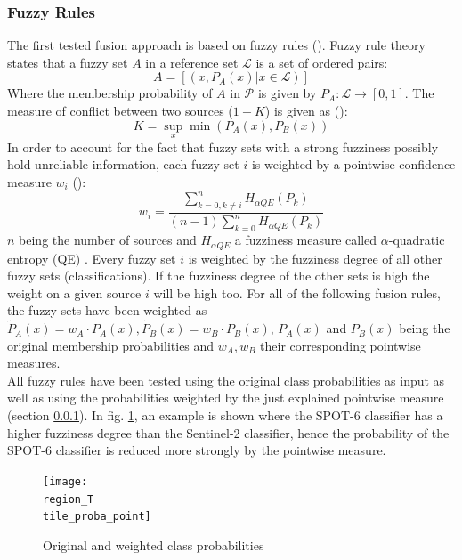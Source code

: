 \documentclass[10pt]{article}
\newcommand{\tile}{41000_30000}
\newcommand{\region}{finistere}
\begin{document}
\subsubsection{Fuzzy Rules}\label{sec:fuzzyLogic}
The first tested fusion approach is based on fuzzy rules (\cite{zadeh_fuzzy_1965}). Fuzzy rule theory states that a fuzzy set $A$ in a reference set $\mathcal{L}$ is a set of ordered pairs:
\begin{equation}
    A=[(x,P_A(x)|x\in \mathcal{L})]
\end{equation}
Where the membership probability of $A$ in $\mathcal{P}$ is given by $P_A:\mathcal{L}\rightarrow[0,1]$. The measure of conflict between two sources ($1-K$) is given as (\cite{dubois_possibility}):
\begin{equation}
    K=\sup_x\min(P_A(x), P_B(x))
\end{equation}
In order to account for the fact that fuzzy sets with a strong fuzziness possibly hold unreliable information, each fuzzy set $i$ is weighted by a pointwise confidence measure $w_i$ (\cite{fauvel_decision_fusion}):
\begin{equation}
    w_i=\frac{\sum_{k=0,k\neq i}^{n}H_{\alpha QE}(P_k)}{(n-1)\sum_{k=0}^{n}H_{\alpha QE}(P_k)}
\end{equation}
$n$ being the number of sources and $H_{\alpha QE}$ a fuzziness measure called $\alpha$-quadratic entropy (QE) \parencite{pal_measuring_1994}. Every fuzzy set $i$ is weighted by the fuzziness degree of all other fuzzy sets (classifications). If the fuzziness degree of the other sets is high the weight on a given source $i$ will be high too. For all of the following fusion rules, the fuzzy sets have been weighted as $\tilde{P}_A(x)=w_A\cdot P_A(x), \tilde{P}_B(x)=w_B\cdot P_B(x)$, $P_A(x)$ and $P_B(x)$ being the original membership probabilities and $w_A, w_B$ their corresponding pointwise measures.\\

All fuzzy rules have been tested using the original class probabilities as input  as well as using the probabilities weighted by the just explained pointwise measure (section \ref{sec:fuzzyLogic}). In fig. \ref{fig:proba_point}, an example is shown where the SPOT-6 classifier has a higher fuzziness degree than the Sentinel-2 classifier, hence the probability of the SPOT-6 classifier is reduced more strongly by the pointwise measure.
\begin{figure}[H]
    \centering
    \texttt{[image: \\region\_T\\tile\_proba\_point]}
    \caption{Original and weighted class probabilities}
    \label{fig:proba_point}
\end{figure}
\end{document}
